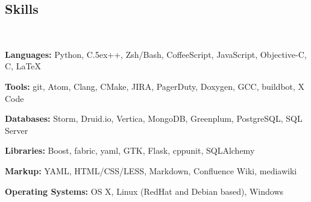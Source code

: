 \documentclass[12pt, tweaklist, line]{res}
\let\tempone\itemize
\let\temptwo\enditemize
\renewenvironment{itemize}{\tempone\vspace{-.15in}\setlength{\topsep}{0pt}\setlength{\itemsep}{3pt}\vspace{-.15in}}{\temptwo}
\def\Cplusplus{{\rm C\raise.5ex\hbox{\small ++}}}
\begin{document}
\begin{resume}
\section{Skills}

~\\ %

\begin{itemize}
\item \textbf{Languages:} Python, \Cplusplus, Zsh/Bash, CoffeeScript, JavaScript, Objective-C, C, \LaTeX
\item \textbf{Tools:} git, Atom, Clang, CMake, JIRA, PagerDuty, Doxygen, GCC, buildbot, X Code
\item \textbf{Databases:} Storm, Druid.io, Vertica, MongoDB, Greenplum, PostgreSQL, SQL Server
\item \textbf{Libraries:} Boost, fabric, yaml, GTK, Flask, cppunit, SQLAlchemy
\item \textbf{Markup:} YAML, HTML/CSS/LESS, Markdown, Confluence Wiki, mediawiki
\item \textbf{Operating Systems:} OS X, Linux (RedHat and Debian based), Windows
\end{itemize}

\end{resume}
\end{document}
